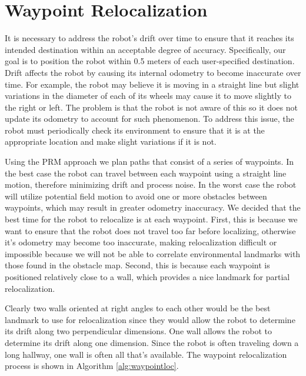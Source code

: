 \documentclass[11pt]{article}
\begin{document}
\section{Waypoint Relocalization}
\label{sec:waypointreloc}

It is necessary to address the robot's drift over time to ensure that it reaches its intended destination within an acceptable degree of accuracy. Specifically, our goal is to position the robot within 0.5 meters of each user-specified destination. Drift affects the robot by causing its internal odometry to become inaccurate over time. For example, the robot may believe it is moving in a straight line but slight variations in the diameter of each of its wheels may cause it to move slightly to the right or left. The problem is that the robot is not aware of this so it does not update its odometry to account for such phenomenon. To address this issue, the robot must periodically check its environment to ensure that it is at the appropriate location and make slight variations if it is not. 

Using the PRM approach we plan paths that consist of a series of waypoints. In the best case the robot can travel between each waypoint using a straight line motion, therefore minimizing drift and process noise. In the worst case the robot will utilize potential field motion to avoid one or more obstacles between waypoints, which may result in greater odometry inaccuracy. We decided that the best time for the robot to relocalize is at each waypoint. First, this is because we want to ensure that the robot does not travel too far before localizing, otherwise it's odometry may become too inaccurate, making relocalization difficult or impossible because we will not be able to correlate environmental landmarks with those found in the obstacle map. Second, this is because each waypoint is positioned relatively close to a wall, which provides a nice landmark for partial relocalization. 

Clearly two walls oriented at right angles to each other would be the best landmark to use for relocalization since they would allow the robot to determine its drift along two perpendicular dimensions. One wall allows the robot to determine its drift along one dimension. Since the robot is often traveling down a long hallway, one wall is often all that's available. The waypoint relocalization process is shown in Algorithm \ref{alg:waypointloc}.
\end{document}
